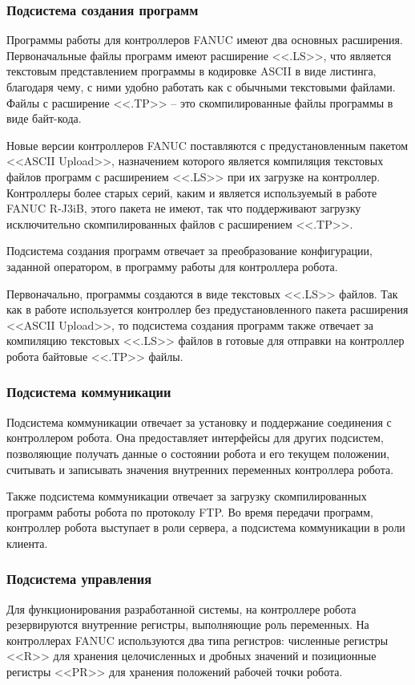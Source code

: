\subsubsection*{Подсистема создания программ}
Программы работы для контроллеров FANUC имеют два основных расширения.
Первоначальные файлы программ имеют расширение <<.LS>>, что является текстовым представлением программы в кодировке ASCII в виде листинга, благодаря чему, с ними удобно работать как с обычными текстовыми файлами.
Файлы с расширение <<.TP>> -- это скомпилированные файлы программы в виде байт-кода.

Новые версии контроллеров FANUC поставляются с предустановленным пакетом <<ASCII Upload>>, назначением которого является компиляция текстовых файлов программ с расширением <<.LS>> при их загрузке на контроллер.
Контроллеры более старых серий, каким и является используемый в работе FANUC R-J3iB, этого пакета не имеют, так что поддерживают загрузку исключительно скомпилированных файлов с расширением <<.TP>>.

Подсистема создания программ отвечает за преобразование конфигурации, заданной оператором, в программу работы для контроллера робота.

Первоначально, программы создаются в виде текстовых <<.LS>> файлов.
Так как в работе используется контроллер без предустановленного пакета расширения <<ASCII Upload>>, то подсистема создания программ также отвечает за компиляцию текстовых <<.LS>> файлов в готовые для отправки на контроллер робота байтовые <<.TP>> файлы.

\subsubsection*{Подсистема коммуникации}
Подсистема коммуникации отвечает за установку и поддержание соединения с контроллером робота.
Она предоставляет интерфейсы для других подсистем, позволяющие получать данные о состоянии робота и его текущем положении, считывать и записывать значения внутренних переменных контроллера робота.

Также подсистема коммуникации отвечает за загрузку скомпилированных программ работы робота по протоколу FTP.
Во время передачи программ, контроллер робота выступает в роли сервера, а подсистема коммуникации в роли клиента.

\subsubsection*{Подсистема управления}
Для функционирования разработанной системы, на контроллере робота резервируются внутренние регистры, выполняющие роль переменных.
На контроллерах FANUC используются два типа регистров: численные регистры <<R>> для хранения целочисленных и дробных значений и позиционные регистры <<PR>> для хранения положений рабочей точки робота.

